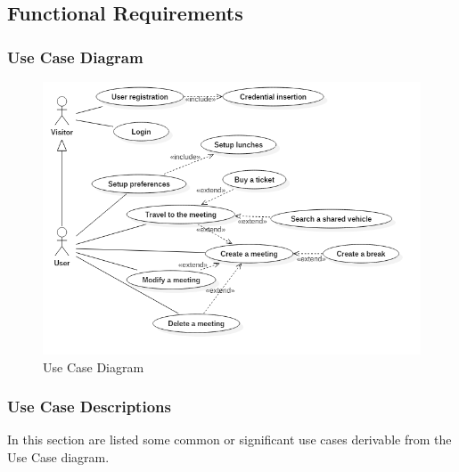 \subsection{Functional Requirements}

\subsubsection{Use Case Diagram}
\begin{figure}[!h]
\centering
\includegraphics[scale=0.8]{images/UseCaseDiagram}
\caption{Use Case Diagram}
\label{ref:usecasediagram}
\end{figure}

\clearpage
\subsubsection{Use Case Descriptions}

In this section are listed some common or significant use cases derivable from
the Use Case diagram.

